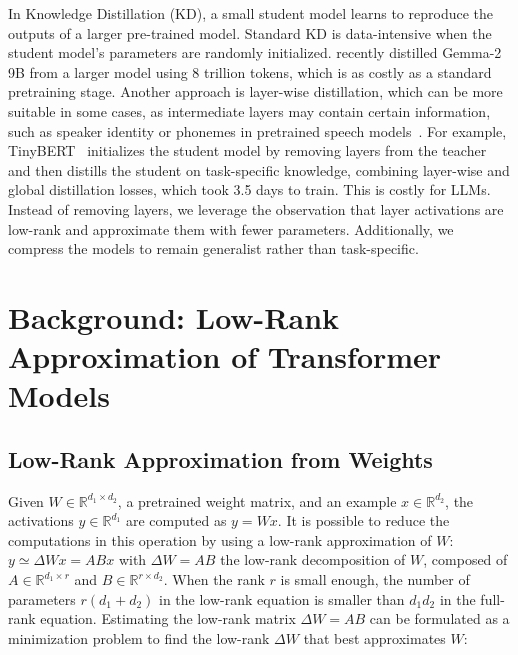 \documentclass[11pt]{article}
\begin{document}
 In Knowledge Distillation (KD), a small student model learns to reproduce the outputs of a larger pre-trained model. Standard KD is data-intensive when the student model's parameters are randomly initialized. \citet{gemmateam2024gemma2improvingopen} recently distilled Gemma-2 9B from a larger model using 8 trillion tokens, which is as costly as a standard pretraining stage. Another approach is layer-wise distillation, which can be more suitable in some cases, as intermediate layers may contain certain information, such as speaker identity or phonemes in pretrained speech models~\citep{baevski2020wav2vec20frameworkselfsupervised, pasad2022layerwiseanalysisselfsupervisedspeech, chang2022distilhubertspeechrepresentationlearning, chang2021explorationselfsupervisedpretrainedrepresentations}. For example, TinyBERT~\citep{jiao_tinybert_2020} initializes the student model by removing layers from the teacher and then distills the student on task-specific knowledge, combining layer-wise and global distillation losses, which took 3.5 days to train. This is costly for LLMs. Instead of removing layers, we leverage the observation that layer activations are low-rank and approximate them with fewer parameters. Additionally, we compress the models to remain generalist rather than task-specific.

\section{Background: Low-Rank Approximation of Transformer Models}

\subsection{Low-Rank Approximation from Weights} 
Given $W \in \mathbb{R}^{d_{1} \times d_{2}}$, a pretrained weight matrix, and an example $x \in \mathbb{R}^{d_{2}}$, the activations $y \in \mathbb{R}^{d_{1}}$ are computed as $y = Wx$. It is possible to reduce the computations in this operation by using a low-rank approximation of $W$: $y \simeq \Delta Wx = ABx$ with $\Delta W = AB$ the low-rank decomposition of $W$, composed of $A \in \mathbb{R}^{d_{1} \times r}$ and $B \in \mathbb{R}^{r \times d_{2}}$. When the rank $r$ is small enough, the number of parameters $r(d_1+d_2)$ in the low-rank equation is smaller than $d_1d_2$ in the full-rank equation. Estimating the low-rank matrix $\Delta W = AB$ can be formulated as a minimization problem to find the low-rank $\Delta W$ that best approximates $W$:
\end{document}
